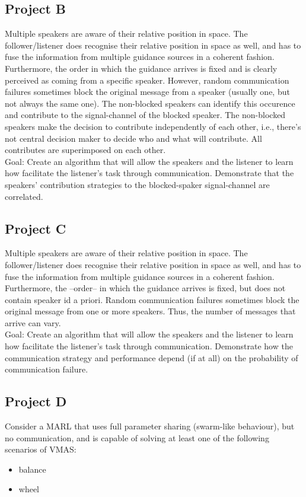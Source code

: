 \documentclass[a4paper,11pt]{article}
\begin{document}
\subsection*{Project B}
Multiple speakers are aware of their relative position in space. The follower/listener does recognise their relative position in space as well, and has to fuse the information from multiple guidance sources in a coherent fashion. Furthermore, the order in which the guidance arrives is fixed and is clearly perceived as coming from a specific speaker. However, random communication failures sometimes block the original message from a speaker (usually one, but not always the same one). The non-blocked speakers can identify this occurence and contribute to the signal-channel of the blocked speaker. The non-blocked speakers make the decision to contribute independently of each other, i.e., there's not central decision maker to decide who and what will contribute. All contributes are superimposed on each other.
\\
Goal: Create an algorithm that will allow the speakers and the listener to learn how facilitate the listener's task through communication. Demonstrate that the speakers' contribution strategies to the blocked-spaker signal-channel are correlated. 

\subsection*{Project C}
Multiple speakers are aware of their relative position in space. The follower/listener does recognise their relative position in space as well, and has to fuse the information from multiple guidance sources in a coherent fashion. Furthermore, the --order-- in which the guidance arrives is fixed, but does not contain speaker id a priori. Random communication failures sometimes block the original message from one or more speakers. Thus, the number of messages that arrive can vary. 
\\
Goal: Create an algorithm that will allow the speakers and the listener to learn how facilitate the listener's task through communication. Demonstrate how the communication strategy and performance depend (if at all) on the probability of communication failure. 

\subsection*{Project D}
Consider a MARL that uses full parameter sharing (swarm-like behaviour), but no communication, and is capable of solving at least one of the following scenarios of VMAS:
\begin{itemize}
    \item balance
    \item wheel
\end{itemize}
\end{document}
